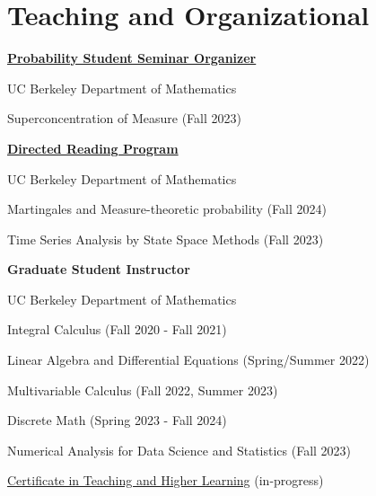 \section{\sc Teaching and Organizational}

{\href{https://math.berkeley.edu/~zmcnulty/pages/seminar.html}{\bf{Probability Student Seminar Organizer}}}
\begin{list1}
\item[] UC Berkeley Department of Mathematics
\begin{list2}
\item[$\circ$] Superconcentration of Measure (Fall 2023)

\end{list2}
\end{list1}

{\href{https://math.berkeley.edu/~zmcnulty/pages/mentorship.html}{\bf{Directed Reading Program}}}
\begin{list1}
\item[] UC Berkeley Department of Mathematics
\begin{list2}

\item[$\circ$] Martingales and Measure-theoretic probability (Fall 2024)
\item[$\circ$] Time Series Analysis by State Space Methods (Fall 2023)

\end{list2}
\end{list1}



{\bf{Graduate Student Instructor}}
\begin{list1}
\item[] UC Berkeley Department of Mathematics
\begin{list2}
\item[$\circ$] Integral Calculus (Fall 2020 - Fall 2021)
\item[$\circ$] Linear Algebra and Differential Equations (Spring/Summer 2022)
\item[$\circ$]  Multivariable Calculus (Fall 2022, Summer 2023)
\item[$\circ$]  Discrete Math (Spring 2023 - Fall 2024)
\item[$\circ$] Numerical Analysis for Data Science and Statistics (Fall 2023)
\item[$\circ$] \href{https://gsi.berkeley.edu/programs-services/certificate-program/}{Certificate in Teaching and Higher Learning} (in-progress)
\end{list2}
\end{list1}





